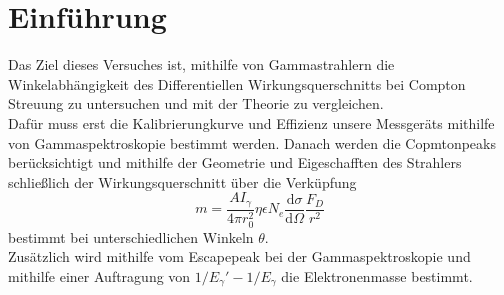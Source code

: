 
\section{Einführung}

Das Ziel dieses Versuches ist, mithilfe von Gammastrahlern die Winkelabhängigkeit des Differentiellen Wirkungsquerschnitts bei Compton Streuung zu untersuchen und mit der Theorie zu vergleichen.\\
Dafür muss erst die Kalibrierungkurve und Effizienz unsere Messgeräts mithilfe von Gammaspektroskopie bestimmt werden. Danach werden die Copmtonpeaks berücksichtigt und mithilfe der Geometrie und Eigeschafften des Strahlers schließlich der Wirkungsquerschnitt über die Verküpfung
\begin{equation}
    m = \frac{AI_\gamma}{4\pi r_0^2}\eta \epsilon N_e \frac{\text{d}\sigma}{\text{d}\Omega}\frac{F_D}{r^2}
\end{equation}
bestimmt bei unterschiedlichen Winkeln $\theta$. 
\\
Zusätzlich wird mithilfe vom Escapepeak bei der Gammaspektroskopie und mithilfe einer Auftragung von $1/E_\gamma'-1/E_\gamma$ die Elektronenmasse bestimmt.

